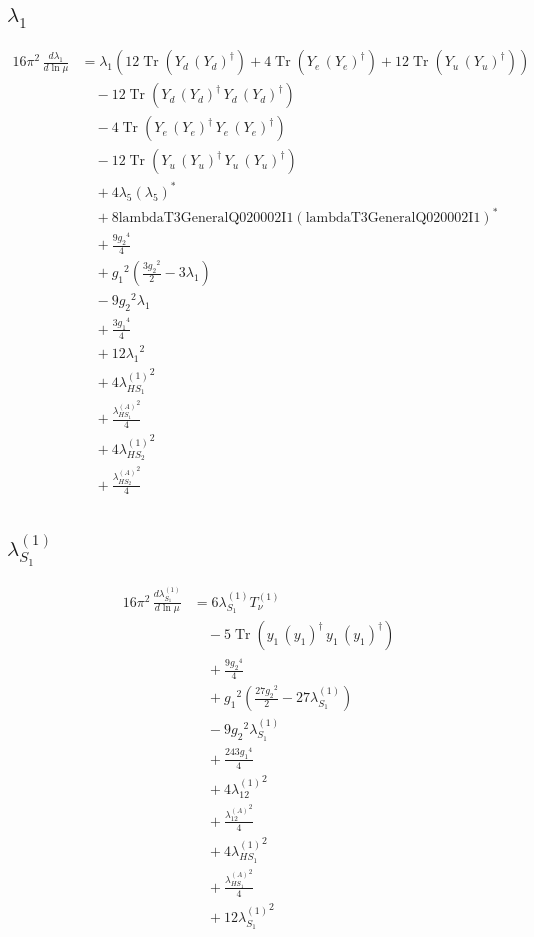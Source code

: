 \documentclass[10pt,a4paper]{article}
\begin{document}
\subsection*{$\lambda_1$}
\begin{align*}
16\pi^2\,\frac{d \lambda_1}{d\ln\mu} &={\lambda_1} (12 \operatorname{Tr}\!\left({Y_d}\,\left({Y_d}\right)^{\dagger}\right)+4 \operatorname{Tr}\!\left({Y_e}\,\left({Y_e}\right)^{\dagger}\right)+12 \operatorname{Tr}\!\left({Y_u}\,\left({Y_u}\right)^{\dagger}\right)) \\
&\quad -12 \operatorname{Tr}\!\left({Y_d}\,\left({Y_d}\right)^{\dagger}\,{Y_d}\,\left({Y_d}\right)^{\dagger}\right) \\
&\quad -4 \operatorname{Tr}\!\left({Y_e}\,\left({Y_e}\right)^{\dagger}\,{Y_e}\,\left({Y_e}\right)^{\dagger}\right) \\
&\quad -12 \operatorname{Tr}\!\left({Y_u}\,\left({Y_u}\right)^{\dagger}\,{Y_u}\,\left({Y_u}\right)^{\dagger}\right) \\
&\quad +4 {\lambda_5} \left({\lambda_5}\right)^{*} \\
&\quad +8 \text{lambdaT3GeneralQ020002I1} \left(\text{lambdaT3GeneralQ020002I1}\right)^{*} \\
&\quad +\frac{9 {g_2}^4}{4} \\
&\quad +{g_1}^2 \left(\frac{3 {g_2}^2}{2}-3 {\lambda_1}\right) \\
&\quad -9 {g_2}^2 {\lambda_1} \\
&\quad +\frac{3 {g_1}^4}{4} \\
&\quad +12 {\lambda_1}^2 \\
&\quad +4 {\lambda_{HS_1}^{(1)}}^2 \\
&\quad +\frac{{\lambda_{HS_1}^{(A)}}^2}{4} \\
&\quad +4 {\lambda_{HS_2}^{(1)}}^2 \\
&\quad +\frac{{\lambda_{HS_2}^{(A)}}^2}{4} \\
\end{align*}
\subsection*{$\lambda_{S_1}^{(1)}$}
\begin{align*}
16\pi^2\,\frac{d \lambda_{S_1}^{(1)}}{d\ln\mu} &=6 {\lambda_{S_1}^{(1)}} T_{\nu}^{(1)} \\
&\quad -5 \operatorname{Tr}\!\left({y_1}\,\left({y_1}\right)^{\dagger}\,{y_1}\,\left({y_1}\right)^{\dagger}\right) \\
&\quad +\frac{9 {g_2}^4}{4} \\
&\quad +{g_1}^2 \left(\frac{27 {g_2}^2}{2}-27 {\lambda_{S_1}^{(1)}}\right) \\
&\quad -9 {g_2}^2 {\lambda_{S_1}^{(1)}} \\
&\quad +\frac{243 {g_1}^4}{4} \\
&\quad +4 {\lambda_{12}^{(1)}}^2 \\
&\quad +\frac{{\lambda_{12}^{(A)}}^2}{4} \\
&\quad +4 {\lambda_{HS_1}^{(1)}}^2 \\
&\quad +\frac{{\lambda_{HS_1}^{(A)}}^2}{4} \\
&\quad +12 {\lambda_{S_1}^{(1)}}^2 \\
\end{align*}
\end{document}

